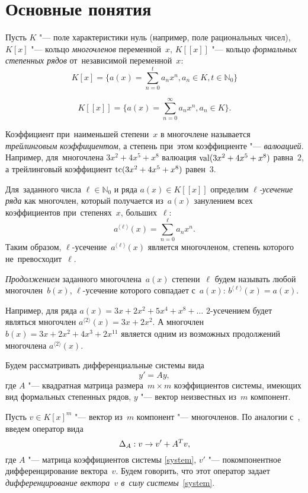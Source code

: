\section{Основные понятия}

Пусть $K$ "--- поле характеристики нуль (например, поле рациональных чисел),
$K[x]$ "--- кольцо \emph{многочленов} переменной~$x$,
$K[[x]]$ "--- кольцо \emph{формальных степенных рядов} от~независимой переменной~$x$:
\[
	K[x] = \{a(x) = \sum\limits_{n = 0}^t a_n x^n, a_n \in K, t \in \mathbb{N}_0\}
\]

\[
	K[[x]] = \{a(x) = \sum\limits_{n = 0}^\infty a_n x^n, a_n \in K\}.
\]

Коэффициент при~наименьшей степени~$x$ в многочлене называется \emph{трейлинговым коэффициентом},
а степень при~этом коэффициенте "--- \emph{валюацией}.
Например, для~многочлена $3x^2 + 4x^5 +x^8$ валюация $\mathop{\rm val}(3x^2 + 4x^5 +x^8)$ равна~$2$,
а трейлинговый коэффициент $\mathop{\rm tc}(3x^2 + 4x^5 +x^8)$ равен~$3$.

Для~заданного числа
$\ell \in \mathbb{N}_0$
и ряда
$a(x) \in K[[x]]$
определим \emph{$\ell$-усечение ряда} как многочлен, который получается из~$a(x)$
занулением всех коэффициентов при~степенях~$x$, больших~$\ell$:
\[
	a^{\langle \ell \rangle}(x) = \sum\limits_{n = 0}^{\ell} a_nx^n .
\]
Таким образом, $\ell$-усечение~$a^{\langle \ell \rangle}(x)$ является многочленом, степень которого не~превосходит~$\ell$.


\emph{Продолжением} заданного многочлена~$a(x)$ степени~$\ell$ будем называть любой многочлен~$b(x)$,
$\ell$-усечение которого совпадает с~$a(x)$: $b^{\langle \ell \rangle}(x) = a(x)$.

Например, для ряда $ a(x) = 3x + 2x^2 + 5x^4 + x^8 + \dots $ $2$-усечением будет являться многочлен $ a^{\langle 2 \rangle}(x) = 3x + 2x^2 $.
А многочлен $ b(x) = 3x + 2x^2 + 4x^3 + 2x^{11} $ является одним из возможных продолжений многочлена $a^{\langle 2 \rangle}(x)$.

\bigskip
Будем рассматривать дифференциальные системы вида
\begin{equation}
	y' = Ay,
	\label{system}
\end{equation}
где $A$ "--- квадратная матрица размера~$m \times m$ коэффициентов системы, имеющих вид формальных степенных рядов,
$y$ "--- вектор неизвестных из~$m$ компонент.

Пусть $v \in K[x]^m$ "--- вектор из~$m$ компонент "--- многочленов. По аналогии с~\cite{litVanDerPut}, введем оператор вида
\begin{equation}
    \text{$ \Delta_A $}: v\rightarrow v' + A^T v,
    \label{differention}
\end{equation}
где $A$ "--- матрица коэффициентов системы \eqref{system}, $v'$ "--- покомпонентное дифференцирование вектора~$v$.
Будем говорить, что этот оператор задает \emph{дифференцирование вектора~$v$ в~силу системы}~\eqref{system}.

